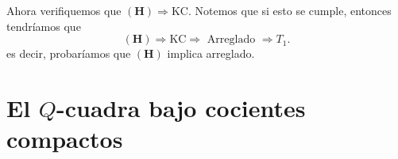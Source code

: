 Ahora verifiquemos que $\mathbf{(H)} \Rightarrow \mathrm{KC}$. Notemos que si esto se cumple, entonces tendríamos que
\[
\mathbf{(H)} \Rightarrow \mathrm{KC} \Rightarrow \mbox{ Arreglado }\Rightarrow T_1.
\]
es decir, probaríamos que $\mathbf{(H)}$ implica arreglado. 

\section{El $Q$-cuadra bajo cocientes compactos}\label{Qcociente}

